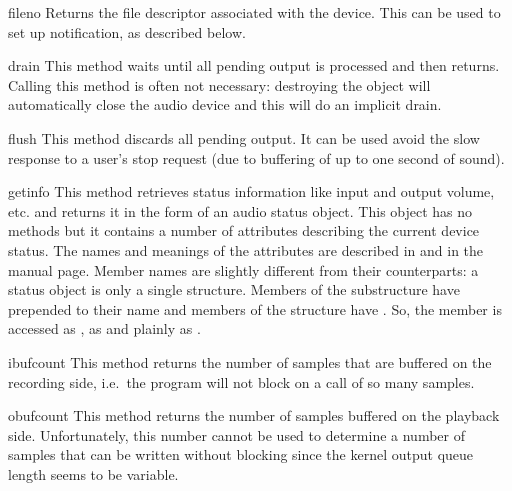 \begin{methoddesc}{fileno}{}
Returns the file descriptor associated with the device.  This can be
used to set up  notification, as described below.
\end{methoddesc}

\begin{methoddesc}{drain}{}
This method waits until all pending output is processed and then returns.
Calling this method is often not necessary: destroying the object will
automatically close the audio device and this will do an implicit drain.
\end{methoddesc}

\begin{methoddesc}{flush}{}
This method discards all pending output. It can be used avoid the
slow response to a user's stop request (due to buffering of up to one
second of sound).
\end{methoddesc}

\begin{methoddesc}{getinfo}{}
This method retrieves status information like input and output volume,
etc. and returns it in the form of
an audio status object. This object has no methods but it contains a
number of attributes describing the current device status. The names
and meanings of the attributes are described in
 and in the 
manual page.  Member names
are slightly different from their \C{} counterparts: a status object is
only a single structure. Members of the  substructure have
 prepended to their name and members of the 
structure have . So, the \C{} member  is
accessed as ,  as 
and  plainly as .
\end{methoddesc}

\begin{methoddesc}{ibufcount}{}
This method returns the number of samples that are buffered on the
recording side, i.e.\ the program will not block on a
 call of so many samples.
\end{methoddesc}

\begin{methoddesc}{obufcount}{}
This method returns the number of samples buffered on the playback
side. Unfortunately, this number cannot be used to determine a number
of samples that can be written without blocking since the kernel
output queue length seems to be variable.
\end{methoddesc}

